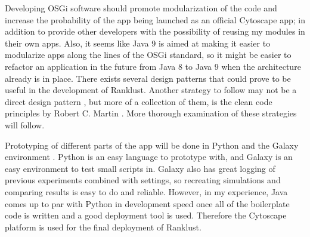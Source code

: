\documentclass[UKenglish,11pt,a4paper]{article}
\begin{document}
Developing OSGi software should promote modularization \cite{modularization} %
of the code and increase the probability of the app being launched as an official Cytoscape app; in addition to provide
other developers with the possibility of reusing my modules in their own apps. Also, it seems like Java 9 is aimed
at making it easier to modularize apps along the lines of the OSGi standard, so it might be easier to refactor an
application in the future from Java 8 to Java 9 when the architecture already is in place. There exists several design 
patterns that could prove to be useful in the development of Ranklust. Another strategy to follow may not be a direct 
design pattern \cite{designpattern}, but more of a collection of them, is the clean code principles by Robert C. Martin 
\cite{cleancode}. More thorough examination of these strategies will follow. 

Prototyping of different parts of the app will be done in Python and the Galaxy environment \cite{galaxy}. Python is an 
easy language to prototype with, and Galaxy is an easy environment to test small scripts in. Galaxy also has great 
logging of previous experiments combined with settings, so recreating simulations and comparing results is easy to do and
reliable. However, in my experience, Java comes up to par with Python in development speed once all of the boilerplate
code is written and a good deployment tool is used. Therefore the Cytoscape platform is used for the final deployment of
Ranklust.


\printbibliography
\end{document}
